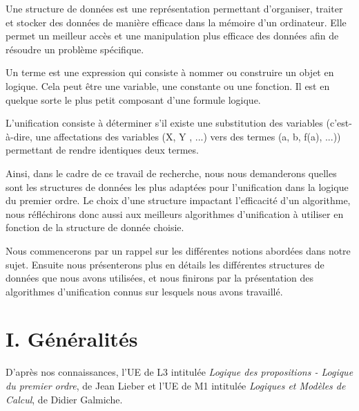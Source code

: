 \documentclass[11pt]{article}
\newenvironment{avantpropos}{%
    \begin{mdframed}[
        linecolor=sectioncolor!40,
        linewidth=0.8pt,
        backgroundcolor=sectioncolor!5,
        innerleftmargin=10pt,
        innerrightmargin=10pt,
        innertopmargin=6pt,
        innerbottommargin=6pt,
        skipabove=8pt,
        skipbelow=8pt
    ]
    \noindent\textbf{\small\color{sectioncolor}}\enspace\small\itshape
}{%
    \end{mdframed}
}
\begin{document}
\vspace{0.5cm}

Une structure de données est une représentation permettant d'organiser, traiter et stocker des données de manière efficace dans la mémoire d'un ordinateur. Elle permet un meilleur accès et une manipulation plus efficace des données afin de résoudre un problème spécifique. 

Un terme est une expression qui consiste à nommer ou construire un objet en logique. Cela peut être une variable, une constante ou une fonction. Il est en quelque sorte le plus petit composant d'une formule logique.

L'unification consiste à déterminer s’il existe
une substitution des variables (c’est-à-dire, une affectations des variables (X, Y , ...) vers des termes
(a, b, f(a), ...)) permettant de rendre identiques deux termes.



\vspace{0.5cm}

Ainsi, dans le cadre de ce travail de recherche, nous nous demanderons quelles sont les structures de données les plus adaptées pour l'unification dans la logique du premier ordre. Le choix d'une structure impactant l'efficacité d'un algorithme, nous réfléchirons donc aussi aux meilleurs algorithmes d'unification à utiliser en fonction de la structure de donnée choisie.

\vspace{0.5cm}

Nous commencerons par un rappel sur les différentes notions abordées dans notre sujet. Ensuite nous présenterons plus en détails les différentes structures de données que nous avons utilisées, et nous finirons par la présentation des algorithmes d'unification connus sur lesquels nous avons travaillé.

\newpage
\section*{I. Généralités}
{}
\label{generalites}

\begin{avantpropos}
    D'après nos connaissances, l'UE de L3 intitulée \emph{Logique des propositions - Logique du premier ordre}, de Jean Lieber et l'UE de M1 intitulée \emph{Logiques et Modèles de Calcul}, de Didier Galmiche.
\end{avantpropos}
\end{document}
